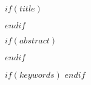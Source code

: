 \flushbottom

$if(title)$
\maketitle
$endif$

$if(abstract)$
\begin{abstract}
$abstract$
\end{abstract}
$endif$

$if(keywords)$
$endif$

\thispagestyle{empty}